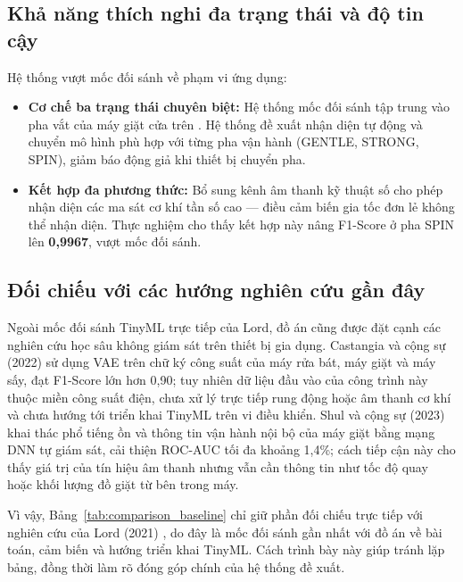 \subsection{Khả năng thích nghi đa trạng thái và độ tin cậy}

Hệ thống vượt mốc đối sánh về phạm vi ứng dụng:
\begin{itemize}
    \item \textbf{Cơ chế ba trạng thái chuyên biệt:} Hệ thống mốc đối sánh tập trung vào pha vắt của máy giặt cửa trên \cite{ref_1_lord}. Hệ thống đề xuất nhận diện tự động và chuyển mô hình phù hợp với từng pha vận hành (GENTLE, STRONG, SPIN), giảm báo động giả khi thiết bị chuyển pha.
    
    \item \textbf{Kết hợp đa phương thức:} Bổ sung kênh âm thanh kỹ thuật số cho phép nhận diện các ma sát cơ khí tần số cao — điều cảm biến gia tốc đơn lẻ không thể nhận diện. Thực nghiệm cho thấy kết hợp này nâng F1-Score ở pha SPIN lên \textbf{0,9967}, vượt mốc đối sánh.
\end{itemize}

\subsection{Đối chiếu với các hướng nghiên cứu gần đây}

Ngoài mốc đối sánh TinyML trực tiếp của Lord, đồ án cũng được đặt cạnh các nghiên cứu học sâu không giám sát trên thiết bị gia dụng. Castangia và cộng sự (2022) \cite{ref_castangia_2022} sử dụng VAE trên chữ ký công suất của máy rửa bát, máy giặt và máy sấy, đạt F1-Score lớn hơn 0,90; tuy nhiên dữ liệu đầu vào của công trình này thuộc miền công suất điện, chưa xử lý trực tiếp rung động hoặc âm thanh cơ khí và chưa hướng tới triển khai TinyML trên vi điều khiển. Shul và cộng sự (2023) \cite{ref_shul_2023} khai thác phổ tiếng ồn và thông tin vận hành nội bộ của máy giặt bằng mạng DNN tự giám sát, cải thiện ROC-AUC tối đa khoảng 1,4\%; cách tiếp cận này cho thấy giá trị của tín hiệu âm thanh nhưng vẫn cần thông tin như tốc độ quay hoặc khối lượng đồ giặt từ bên trong máy.

Vì vậy, Bảng~\ref{tab:comparison_baseline} chỉ giữ phần đối chiếu trực tiếp với nghiên cứu của Lord (2021) \cite{ref_1_lord}, do đây là mốc đối sánh gần nhất với đồ án về bài toán, cảm biến và hướng triển khai TinyML. Cách trình bày này giúp tránh lặp bảng, đồng thời làm rõ đóng góp chính của hệ thống đề xuất.

